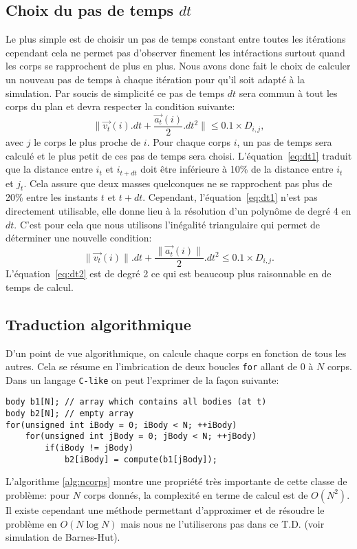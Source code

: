 \subsection{Choix du pas de temps $dt$}
Le plus simple est de choisir un pas de temps constant entre toutes les itérations cependant cela ne permet pas d'observer finement les intéractions surtout quand les corps se rapprochent de plus en plus.
Nous avons donc fait le choix de calculer un nouveau pas de temps à chaque itération pour qu'il soit adapté à la simulation.
Par soucis de simplicité ce pas de temps $dt$ sera commun à tout les corps du plan et devra respecter la condition suivante:
\begin{equation}
\label{eq:dt1}
\|\vec{v_t}(i).dt + \frac{\vec{a_t}(i)}{2}.dt^2 \| \leq 0.1\times D_{i,j},
\end{equation}
avec $j$ le corps le plus proche de $i$.
Pour chaque corps $i$, un pas de temps sera calculé et le plus petit de ces pas de temps sera choisi.
L'équation~\ref{eq:dt1} traduit que la distance entre $i_t$ et $i_{t+dt}$ doit être inférieure à 10\% de la distance entre $i_t$ et $j_t$.
Cela assure que deux masses quelconques ne se rapprochent pas plus de 20\% entre les instants $t$ et $t + dt$.
Cependant, l'équation~\ref{eq:dt1} n'est pas directement utilisable, elle donne lieu à la résolution d'un polynôme de degré 4 en $dt$.
C'est pour cela que nous utilisons l'inégalité triangulaire qui permet de déterminer une nouvelle condition:
\begin{equation}
\label{eq:dt2}
\|\vec{v_t}(i)\|.dt + \frac{\|\vec{a_t}(i)\|}{2}.dt^2  \leq 0.1\times D_{i,j}.
\end{equation}
L'équation~\ref{eq:dt2} est de degré 2 ce qui est beaucoup plus raisonnable en de temps de calcul.

\subsection{Traduction algorithmique}
D'un point de vue algorithmique, on calcule chaque corps en fonction de tous les autres.
Cela se résume en l'imbrication de deux boucles \texttt{for} allant de $0$ à $N$ corps.
Dans un langage \texttt{C-like} on peut l'exprimer de la façon suivante:
\begin{lstlisting}[caption={Pseudo code illustrant un algorithme de type $N$ corps},label={alg:ncorps}]
body b1[N]; // array which contains all bodies (at t)
body b2[N]; // empty array
for(unsigned int iBody = 0; iBody < N; ++iBody)
	for(unsigned int jBody = 0; jBody < N; ++jBody)
		if(iBody != jBody)
			b2[iBody] = compute(b1[jBody]);
\end{lstlisting}
L'algorithme \ref{alg:ncorps} montre une propriété très importante de cette classe de problème: pour $N$ corps donnés, la complexité en terme de calcul est de $O(N^2)$. 
Il existe cependant une méthode permettant d'approximer et de résoudre le problème en $O(N \log{N} )$ mais nous ne l'utiliserons pas dans ce T.D. (voir simulation de {\sc Barnes-Hut}).

